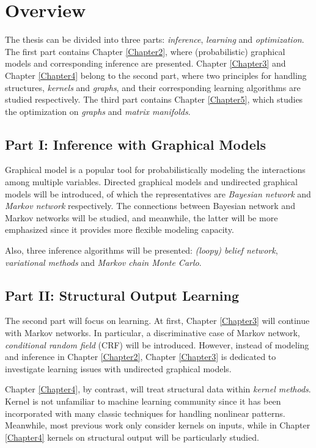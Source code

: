 \section{Overview}
\label{sec:overview}
The thesis can be divided into three parts: \emph{inference}, \emph{learning} and \emph{optimization}. The first part contains Chapter \ref{Chapter2}, where (probabilistic) graphical models 
and corresponding inference are presented. Chapter \ref{Chapter3} and Chapter \ref{Chapter4} belong to the second part, where two principles
for handling structures, \emph{kernels} and \emph{graphs}, and their corresponding learning algorithms are studied respectively. 
The third part contains Chapter \ref{Chapter5}, which studies the optimization on 
\emph{graphs} and \emph{matrix manifolds}.                    

\subsection{Part I: Inference with Graphical Models}
Graphical model is a popular tool for probabilistically modeling the interactions among multiple variables. Directed graphical models and undirected graphical models will be introduced, of which 
the representatives are \emph{Bayesian network} and \emph{Markov network} 
respectively. The connections between Bayesian network and Markov networks will be studied,  and meanwhile, the latter will be more emphasized 
since it provides more flexible modeling capacity.        

Also, three inference algorithms will be presented: \emph{(loopy) belief network}, \emph{variational methods} and \emph{Markov chain Monte Carlo}. 
\subsection{Part II: Structural Output Learning}
The second part will focus on learning. At first, Chapter \ref{Chapter3} will continue with Markov networks. In particular, a discriminative case of Markov network, \emph{conditional random field} (CRF) 
will be introduced. However, instead of modeling and inference in Chapter \ref{Chapter2}, Chapter \ref{Chapter3} is dedicated to investigate learning issues with undirected graphical models.          

Chapter \ref{Chapter4}, by contrast, will treat structural data within \emph{kernel methods}. Kernel is not unfamiliar to machine learning community since it has been incorporated with many 
classic techniques for handling nonlinear patterns. Meanwhile, most previous work only consider kernels on inputs, while in Chapter \ref{Chapter4} kernels on structural output will be particularly 
studied.         


